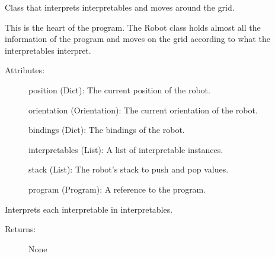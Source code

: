 \documentclass[letterpaper,10pt,english]{sphinxmanual}
\begin{document}
\begin{fulllineitems}
\label{\detokenize{robol:robol_lang.robol.Robot}}
\sphinxAtStartPar
Class that interprets interpretables and moves around the grid.

\sphinxAtStartPar
This is the heart of the program. The Robot class holds almost all the
information of the program and moves on the grid according to what the
interpretables interpret.
\begin{description}
\item[{Attributes:}] \leavevmode
\sphinxAtStartPar
position (Dict): The current position of the robot.

\sphinxAtStartPar
orientation (Orientation): The current orientation of the robot.

\sphinxAtStartPar
bindings (Dict): The bindings of the robot.

\sphinxAtStartPar
interpretables (List): A list of interpretable instances.

\sphinxAtStartPar
stack (List): The robot’s stack to push and pop values.

\sphinxAtStartPar
program (Program): A reference to the program.

\end{description}

\begin{fulllineitems}
\label{\detokenize{robol:robol_lang.robol.Robot.interpret}}
\sphinxAtStartPar
Interprets each interpretable in interpretables.
\begin{description}
\item[{Returns:}] \leavevmode
\sphinxAtStartPar
None

\end{description}

\end{fulllineitems}


\end{fulllineitems}

\end{document}
